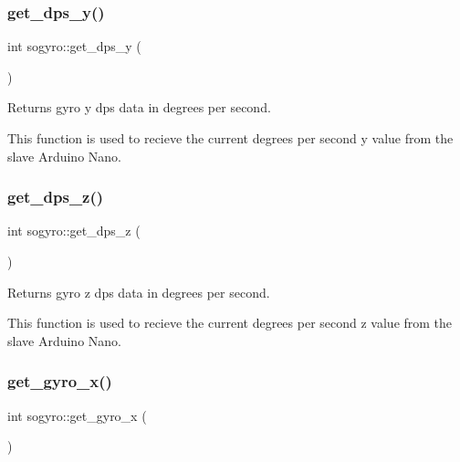 \subsubsection{\texorpdfstring{get\+\_\+dps\+\_\+y()}{get\_dps\_y()}}
{\footnotesize\ttfamily int sogyro\+::get\+\_\+dps\+\_\+y (\begin{DoxyParamCaption}{ }\end{DoxyParamCaption})\hspace{0.3cm}{\ttfamily [inline]}}



Returns gyro y dps data in degrees per second. 

This function is used to recieve the current degrees per second y value from the slave Arduino Nano. \mbox{\label{classsogyro_acaaac40f021d89a77c093b2303e6e79c}} 
\subsubsection{\texorpdfstring{get\+\_\+dps\+\_\+z()}{get\_dps\_z()}}
{\footnotesize\ttfamily int sogyro\+::get\+\_\+dps\+\_\+z (\begin{DoxyParamCaption}{ }\end{DoxyParamCaption})\hspace{0.3cm}{\ttfamily [inline]}}



Returns gyro z dps data in degrees per second. 

This function is used to recieve the current degrees per second z value from the slave Arduino Nano. \mbox{\label{classsogyro_a69d818342aa6a4688afc26d8db62af33}} 
\subsubsection{\texorpdfstring{get\+\_\+gyro\+\_\+x()}{get\_gyro\_x()}}
{\footnotesize\ttfamily int sogyro\+::get\+\_\+gyro\+\_\+x (\begin{DoxyParamCaption}{ }\end{DoxyParamCaption})\hspace{0.3cm}{\ttfamily [inline]}}




